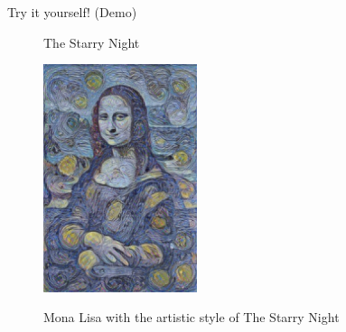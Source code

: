 \documentclass[final]{beamer}
\newlength{\colwidth}
\begin{document}
\begin{frame}{}
\begin{columns}[t]
\begin{column}{\colwidth}
\begin{myblock}{Try it yourself! (Demo)}
\begin{figure}
\begin{minipage}{.5\textwidth}
            The Starry Night
        \end{minipage}
    \end{figure}
    \vspace{1cm}
    \begin{figure}
        \centering
        \includegraphics[width=0.4\textwidth]{Images/Style-Transfer.jpg}
        
        Mona Lisa with the artistic style of The Starry Night
    \end{figure}
    \vspace{1.5cm}
    \end{myblock}
\end{column}


\end{columns}
\end{frame}
\end{document}
